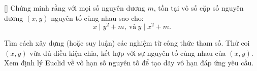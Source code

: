 \documentclass[../04-diophantine-equations.tex]{subfiles}
\begin{document}
\begin{exercise*}\label{example:BGR-2015-EGMO-TST-P4}[\textbf{}]
	\footnotemark Chứng minh rằng với mọi số nguyên dương \( m \), tồn tại vô số cặp số nguyên dương \( (x, y) \) nguyên tố cùng nhau sao cho:
	\[ x \mid y^2 + m,\ \text{và}\ y \mid x^2 + m. \]
\end{exercise*}

\begin{remark*}
	Tìm cách xây dựng (hoặc suy luận) các nghiệm từ công thức tham số.  
	Thử coi \((x,y)\) vừa đủ điều kiện chia, kết hợp với sự nguyên tố cùng nhau của \((x,y)\).  
	Xem định lý Euclid về vô hạn số nguyên tố để tạo dãy vô hạn đáp ứng yêu cầu.
\end{remark*}

\end{document}
